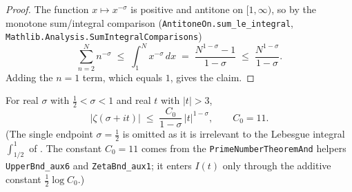 \begin{proof}
\leanok
The function $x\mapsto x^{-\sigma}$ is positive and antitone on $[1,\infty)$, so by
the monotone sum/integral comparison
(\texttt{AntitoneOn.sum\_le\_integral}, \texttt{Mathlib.Analysis.SumIntegralComparisons})
\[
  \sum_{n=2}^{N} n^{-\sigma}
  \;\le\; \int_{1}^{N} x^{-\sigma}\,dx
  \;=\; \frac{N^{1-\sigma}-1}{1-\sigma}
  \;\le\; \frac{N^{1-\sigma}}{1-\sigma}.
\]
Adding the $n=1$ term, which equals $1$, gives the claim.
\end{proof}

\begin{lemma}
\label{lem:lb_zeta_strip}
\leanok
{}
For real $\sigma$ with $\tfrac12<\sigma<1$ and real $t$ with $|t|>3$,
\[
  |\zeta(\sigma+it)| \;\le\; \frac{C_0}{1-\sigma}\,|t|^{1-\sigma},
  \qquad C_0 = 11 .
\]
(The single endpoint $\sigma=\tfrac12$ is omitted as it is irrelevant to the
Lebesgue integral $\int_{1/2}^{1}$ of . The constant $C_0=11$
comes from the \texttt{PrimeNumberTheoremAnd} helpers \texttt{UpperBnd\_aux6} and
\texttt{ZetaBnd\_aux1}; it enters $I(t)$ only through the additive constant
$\tfrac12\log C_0$.)
\end{lemma}


